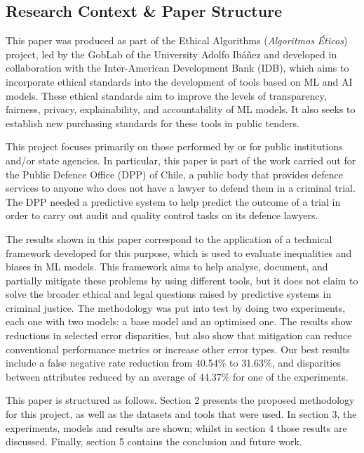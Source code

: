 \documentclass[fleqn,10pt]{wlscirep}
\begin{document}
\subsection{Research Context \& Paper Structure}

This paper was produced as part of the Ethical Algorithms (\textit{Algoritmos Éticos}) project, led by the GobLab of the University Adolfo Ibáñez and developed in collaboration with the Inter-American Development Bank (IDB), which aims to incorporate ethical standards into the development of tools based on ML and AI models. These ethical standards aim to improve the levels of transparency, fairness, privacy, explainability, and accountability of ML models. It also seeks to establish new purchasing standards for these tools in public tenders.

This project focuses primarily on those performed by or for public institutions and/or state agencies. In particular, this paper is part of the work carried out for the Public Defence Office (DPP) of Chile, a public body that provides defence services to anyone who does not have a lawyer to defend them in a criminal trial. The DPP needed a predictive system to help predict the outcome of a trial in order to carry out audit and quality control tasks on its defence lawyers.

The results shown in this paper correspond to the application of a technical framework developed for this purpose, which is used to evaluate inequalities and biases in ML models. This framework aims to help analyse, document, and partially mitigate these problems by using different tools, but it does not claim to solve the broader ethical and legal questions raised by predictive systems in criminal justice. The methodology was put into test by doing two experiments, each one with two models: a base model and an optimised one. The results show reductions in selected error disparities, but also show that mitigation can reduce conventional performance metrics or increase other error types. Our best results include a false negative rate reduction from 40.54\% to 31.63\%, and disparities between attributes reduced by an average of 44.37\% for one of the experiments.

This paper is structured as follows. Section 2 presents the proposed methodology for this project, as well as the datasets and tools that were used. In section 3, the experiments, models and results are shown; whilst in section 4 those results are discussed. Finally, section 5 contains the conclusion and future work.
\end{document}
